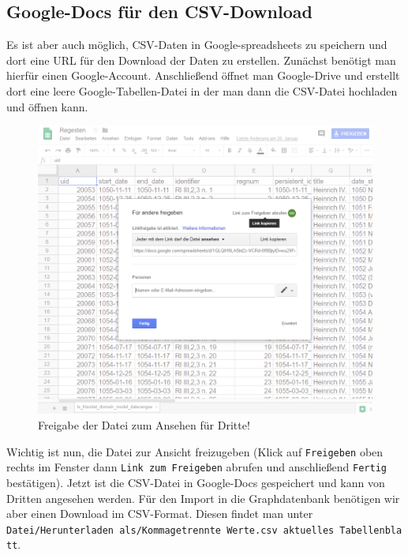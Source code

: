 \documentclass[ngerman,]{scrreprt}
\begin{document}
\subsection{Google-Docs für den CSV-Download}\label{google-docs-fuxfcr-den-csv-download}

Es ist aber auch möglich, CSV-Daten in Google-spreadsheets zu speichern und dort eine URL für den Download der Daten zu erstellen. Zunächst benötigt man hierfür einen Google-Account. Anschließend öffnet man Google-Drive und erstellt dort eine leere Google-Tabellen-Datei in der man dann die CSV-Datei hochladen und öffnen kann.

\begin{figure}
\centering
\includegraphics{Bilder/RI2Graph/google-docs-freigeben.png}
\caption{Freigabe der Datei zum Ansehen für Dritte!}
\end{figure}

Wichtig ist nun, die Datei zur Ansicht freizugeben (Klick auf \texttt{Freigeben} oben rechts im Fenster dann \texttt{Link\ zum\ Freigeben} abrufen und anschließend \texttt{Fertig} bestätigen). Jetzt ist die CSV-Datei in Google-Docs gespeichert und kann von Dritten angesehen werden. Für den Import in die Graphdatenbank benötigen wir aber einen Download im CSV-Format. Diesen findet man unter \texttt{Datei/Herunterladen\ als/Kommagetrennte\ Werte.csv\ aktuelles\ Tabellenblatt}.
\end{document}
